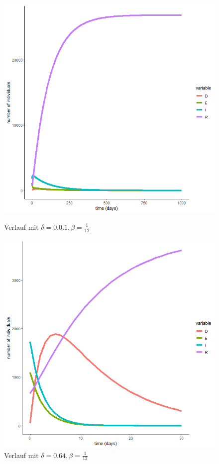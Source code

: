 \documentclass{scrartcl}
\begin{document}
	\begin{figure}[h]
        	\centering
        	\begin{minipage}[b]{0.45\textwidth}
		\includegraphics[scale=0.35]{delta=0,01,beta=1durch12,ohne_s.png}
		\caption{Verlauf mit $\delta = 0.0.1, \beta = \frac{1}{12}$}
		\end{minipage}
 		\hfill
 		\begin{minipage}[b]{0.45\textwidth}
		\includegraphics[scale=0.35]{delta=0,64,beta=1durch12,ohne_s.png}
		\caption{Verlauf mit $\delta = 0.64, \beta = \frac{1}{12}$}
		\end{minipage}
	\end{figure}
\end{document}
